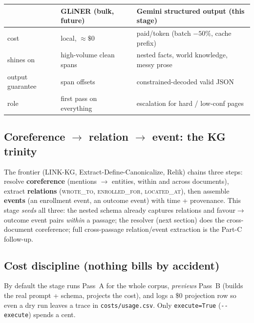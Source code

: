 \documentclass[11pt]{article}
\newcommand{\code}[1]{\texttt{#1}}
\newcommand{\file}[1]{\texttt{#1}}
\begin{document}
\begin{center}
\small
\begin{tabular}{lll}
\toprule
 & GLiNER (bulk, future) & Gemini structured output (this stage) \\
\midrule
cost            & local, $\approx\$0$        & paid/token (batch $-50\%$, cache prefix) \\
shines on       & high-volume clean spans    & nested facts, world knowledge, messy prose \\
output guarantee& span offsets               & constrained-decoded valid JSON \\
role            & first pass on everything   & escalation for hard / low-conf pages \\
\bottomrule
\end{tabular}
\end{center}

\subsection{Coreference $\to$ relation $\to$ event: the KG trinity}

The frontier (LINK-KG, Extract-Define-Canonicalize, Relik) chains three steps:
resolve \textbf{coreference} (mentions $\to$ entities, within and across documents),
extract \textbf{relations} (\textsc{wrote\_to}, \textsc{enrolled\_for},
\textsc{located\_at}), then assemble \textbf{events} (an enrollment event, an
outcome event) with time + provenance. This stage \emph{seeds} all three: the
nested schema already captures relations and favour$\to$outcome event pairs
\emph{within} a passage; the resolver (next section) does the cross-document
coreference; full cross-passage relation/event extraction is the Part-C follow-up.

\subsection{Cost discipline (nothing bills by accident)}

\begin{cautionbox}
By default the stage runs Pass~A for the whole corpus, \emph{previews} Pass~B
(builds the real prompt + schema, projects the cost), and logs a \$0 projection row
so even a dry run leaves a trace in \file{costs/usage.csv}. Only \code{execute=True}
(\code{-{}-execute}) spends a cent.
\end{cautionbox}
\end{document}
